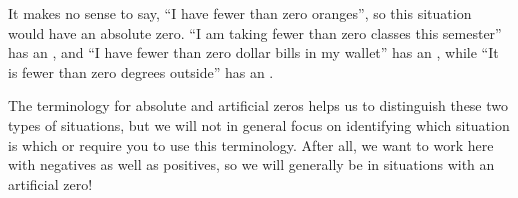 \documentclass{ximera}
\begin{document}
 \begin{explanation}
  It makes no sense to say, ``I have fewer than zero oranges'', so this situation would have an absolute zero.  ``I am taking fewer than zero classes this semester'' has an , and ``I have fewer than zero dollar bills in my wallet'' has an , while ``It is fewer than zero degrees outside'' has an .
  \end{explanation}
  
  The terminology for absolute and artificial zeros helps us to distinguish these two types of situations, but we will not in general focus on identifying which situation is which or require you to use this terminology.  After all, we want to work here with negatives as well as positives, so we will generally be in situations with an artificial zero!
\end{document}
